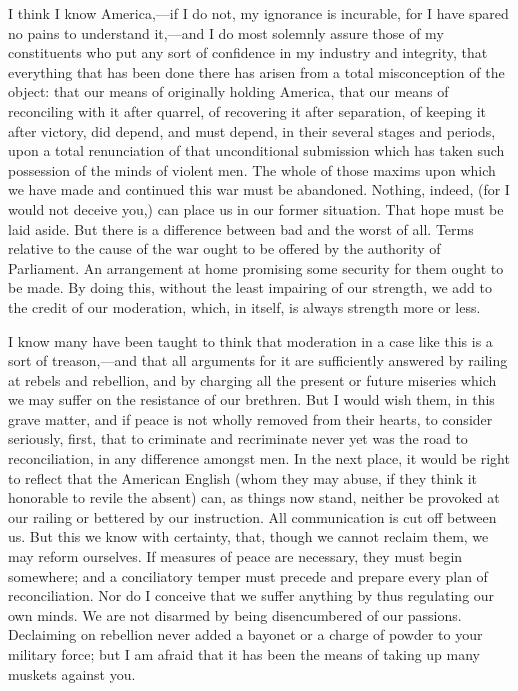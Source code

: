 I think I know America,—if I do not, my ignorance is incurable, for I have spared no pains to understand it,—and I do most solemnly assure those of my constituents who put any sort of confidence in my industry and integrity, that everything that has been done there has arisen from a total misconception of the object: that our means of originally holding America, that our means of reconciling with it after quarrel, of recovering it after separation, of keeping it after victory, did depend, and must depend, in their several stages and periods, upon a total renunciation of that unconditional submission which has taken such possession of the minds of violent men. The whole of those maxims upon which we have made and continued this war must be abandoned. Nothing, indeed, (for I would not deceive you,) can place us in our former situation. That hope must be laid aside. But there is a difference between bad and the worst of all. Terms relative to the cause of the war ought to be offered by the authority of Parliament. An arrangement at home promising some security for them ought to be made. By doing this, without the least impairing of our strength, we add to the credit of our moderation, which, in itself, is always strength more or less.

I know many have been taught to think that moderation in a case like this is a sort of treason,—and that all arguments for it are sufficiently answered by railing at rebels and rebellion, and by charging all the present or future miseries which we may suffer on the resistance of our brethren. But I would wish them, in this grave matter, and if peace is not wholly removed from their hearts, to consider seriously, first, that to criminate and recriminate never yet was the road to reconciliation, in any difference amongst men. In the next place, it would be right to reflect that the American English (whom they may abuse, if they think it honorable to revile the absent) can, as things now stand, neither be provoked at our railing or bettered by our instruction. All communication is cut off between us. But this we know with certainty, that, though we cannot reclaim them, we may reform ourselves. If measures of peace are necessary, they must begin somewhere; and a conciliatory temper must precede and prepare every plan of reconciliation. Nor do I conceive that we suffer anything by thus regulating our own minds. We are not disarmed by being disencumbered of our passions. Declaiming on rebellion never added a bayonet or a charge of powder to your military force; but I am afraid that it has been the means of taking up many muskets against you.

